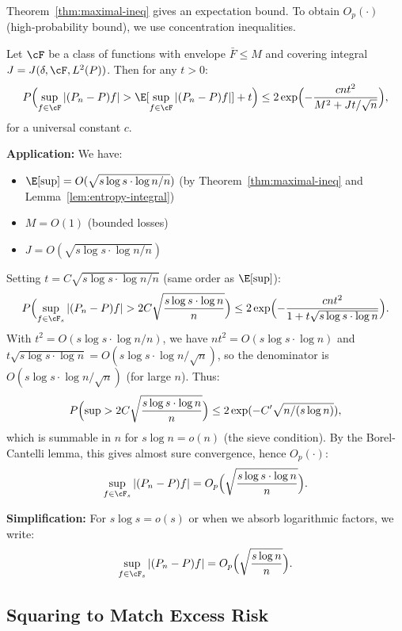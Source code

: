 Theorem~\ref{thm:maximal-ineq} gives an expectation bound. To obtain $O_p(\cdot)$ (high-probability bound), we use concentration inequalities.

\begin{theorem}
\label{thm:talagrand}
Let $\cF$ be a class of functions with envelope $\bar{F} \le M$ and covering integral $J = J(\delta, \cF, L^2(P))$. Then for any $t > 0$:
\[
P\Bigl( \sup_{f \in \cF} |(P_n - P)f| > \E[\sup_{f \in \cF} |(P_n - P)f|] + t \Bigr) \le 2 \exp\Bigl( - \frac{cnt^2}{M^2 + Jt/\sqrt{n}} \Bigr),
\]
for a universal constant $c$.
\end{theorem}

\textbf{Application:}
We have:
\begin{itemize}
\item $\E[\sup] = O(\sqrt{s \log s \cdot \log n / n})$ (by Theorem~\ref{thm:maximal-ineq} and Lemma~\ref{lem:entropy-integral})
\item $M = O(1)$ (bounded losses)
\item $J = O(\sqrt{s \log s \cdot \log n / n})$
\end{itemize}

Setting $t = C \sqrt{s \log s \cdot \log n / n}$ (same order as $\E[\sup]$):
\[
P\Bigl( \sup_{f \in \cF_s} |(P_n - P)f| > 2C \sqrt{\frac{s \log s \cdot \log n}{n}} \Bigr) \le 2 \exp\Bigl( - \frac{c n t^2}{1 + t \sqrt{s \log s \cdot \log n}} \Bigr).
\]
With $t^2 = O(s \log s \cdot \log n / n)$, we have $nt^2 = O(s \log s \cdot \log n)$ and $t\sqrt{s \log s \cdot \log n} = O(s \log s \cdot \log n / \sqrt{n})$, so the denominator is $O(s \log s \cdot \log n / \sqrt{n})$ (for large $n$). Thus:
\[
P\Bigl( \sup > 2C \sqrt{\frac{s \log s \cdot \log n}{n}} \Bigr) \le 2 \exp( - C' \sqrt{n / (s \log n)} ),
\]
which is summable in $n$ for $s \log n = o(n)$ (the sieve condition). By the Borel-Cantelli lemma, this gives almost sure convergence, hence $O_p(\cdot)$:
\[
\sup_{f \in \cF_s} |(P_n - P)f| = O_p\Bigl( \sqrt{\frac{s \log s \cdot \log n}{n}} \Bigr).
\]

\textbf{Simplification:}
For $s \log s = o(s)$ or when we absorb logarithmic factors, we write:
\[
\sup_{f \in \cF_s} |(P_n - P)f| = O_p\Bigl( \sqrt{\frac{s \log n}{n}} \Bigr).
\]

\subsection{Squaring to Match Excess Risk}

